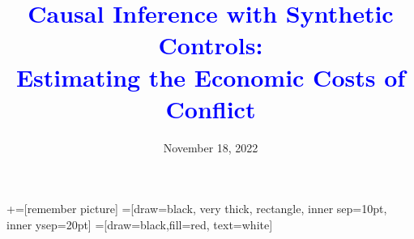 \documentclass[notes,11pt, aspectratio=169]{beamer}
\title[]{\textcolor{blue}{Causal Inference with Synthetic Controls:\\ Estimating the Economic Costs of Conflict }}
\institute[GSB]{\small{\begin{tabular}{c}
Alexander J. Almeida \\
Stanford Graduate School of Business\\
\end{tabular}}}
\date{November 18, 2022}
\begin{document}
\newcommand\marktopleft[1]{%
    \tikz[overlay,remember picture] 
        \node (marker-#1-a) at (-.3em,.3em) {};%
}
\newcommand\markbottomright[2]{%
    \tikz[overlay,remember picture] 
        \node (marker-#1-b) at (0em,0em) {};%
}
+=[remember picture] 
 =[draw=black, very thick, rectangle, inner sep=10pt, inner ysep=20pt]
 =[draw=black,fill=red, text=white]

\begin{frame}
\maketitle
\end{frame}




% 

\end{document}
